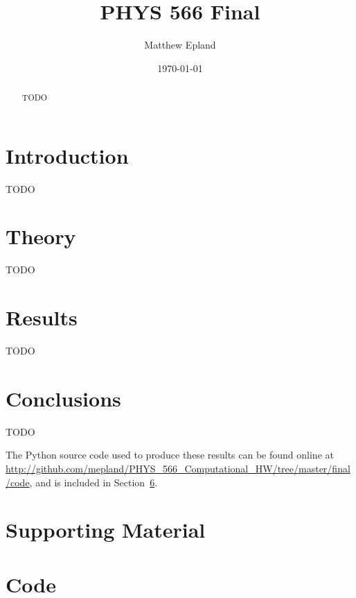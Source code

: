 \documentclass[notitlepage,aps,prd,nofootinbib]{revtex4-1}
\begin{document}
\title{PHYS 566 Final}
\author{Matthew Epland}

\date{\today}

\begin{abstract}
TODO
\end{abstract}\maketitle

\section{Introduction}
\label{sec:intro}
TODO

\section{Theory}
\label{sec:theory}
TODO


\section{Results}
\label{sec:results}
TODO






\clearpage
\section{Conclusions}
\label{sec:Conclusions}
TODO

The Python source code used to produce these results can be found online at \url{http://github.com/mepland/PHYS_566_Computational_HW/tree/master/final/code}, and is included in Section~\ref{sec:code}.


\section{Supporting Material}
\label{sec:Supporting_Material}



\clearpage


\clearpage
\section{Code}
\label{sec:code}

\end{document}
